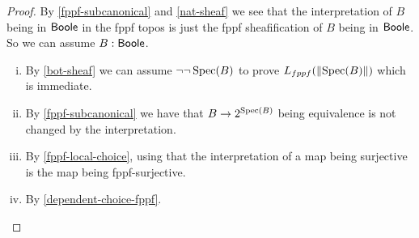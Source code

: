 \begin{proof}
By \cref{fppf-subcanonical} and \cref{nat-sheaf} we see that the interpretation of $B$ being in $\mathsf{Boole}$ in the fppf topos is just the fppf sheafification of $B$ being in $\mathsf{Boole}$. So we can assume $B:\mathsf{Boole}$.
\begin{enumerate}[(i)]
\item By \cref{bot-sheaf} we can assume $\neg\neg\operatorname{Spec}(B)$ to prove $L_{fppf}(\lVert \operatorname{Spec}(B) \rVert)$ which is immediate.
\item By \cref{fppf-subcanonical} we have that $B\to {2}^{\operatorname{Spec}(B)}$ being equivalence is not changed by the interpretation.
\item By \cref{fppf-local-choice}, using that the interpretation of a map being surjective is the map being fppf-surjective.
\item By \cref{dependent-choice-fppf}.
\end{enumerate}
\end{proof}

